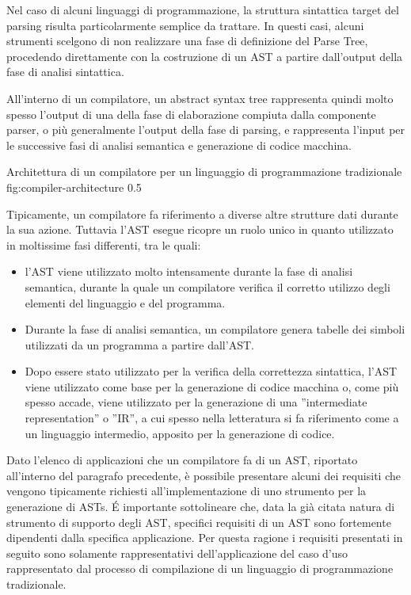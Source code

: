 Nel caso di alcuni linguaggi di programmazione, la struttura sintattica target
del parsing risulta particolarmente semplice da trattare. In questi casi, alcuni
strumenti scelgono di non realizzare una fase di definizione del Parse Tree,
procedendo direttamente con la costruzione di un AST a partire dall’output della
fase di analisi sintattica.

All’interno di un compilatore, un abstract syntax tree rappresenta quindi molto
spesso l’output di una della fase di elaborazione compiuta dalla componente
parser, o più generalmente l’output della fase di parsing, e rappresenta
l’input per le successive fasi di analisi semantica e generazione di codice
macchina.

      {Architettura di un compilatore per un linguaggio di programmazione
      tradizionale}
      {fig:compiler-architecture}
      {0.5}

Tipicamente, un compilatore fa riferimento a diverse altre strutture dati
durante la sua azione. Tuttavia l’AST esegue ricopre un ruolo unico in quanto
utilizzato in moltissime fasi differenti, tra le quali:

\begin{itemize}

\item l'AST viene utilizzato molto intensamente durante la fase di analisi
semantica, durante la quale un compilatore verifica il corretto utilizzo degli
elementi del linguaggio e del programma.

\item Durante la fase di analisi semantica, un compilatore genera tabelle dei
simboli utilizzati da un programma a partire dall’AST.

\item Dopo essere stato utilizzato per la verifica della correttezza sintattica,
l’AST viene utilizzato come base per la generazione di codice macchina o, come
più spesso accade, viene utilizzato per la generazione di una ”intermediate
representation” o ”IR”, a cui spesso nella letteratura si fa riferimento come a
un linguaggio intermedio, apposito per la generazione di codice.

\end{itemize}

Dato l’elenco di applicazioni che un compilatore fa di un AST, riportato
all’interno del paragrafo precedente, è possibile presentare alcuni dei
requisiti che vengono tipicamente richiesti all’implementazione di uno strumento
per la generazione di ASTs. É importante sottolineare che, data la già citata
natura di strumento di supporto degli AST, specifici requisiti di un AST sono
fortemente dipendenti dalla specifica applicazione. Per questa ragione i
requisiti presentati in seguito sono solamente rappresentativi dell’applicazione
del caso d'uso rappresentato dal processo di compilazione di un linguaggio di
programmazione tradizionale.

